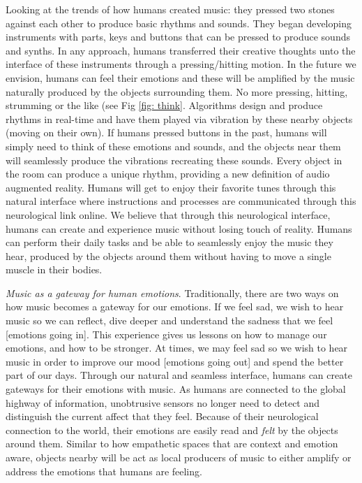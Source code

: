 \documentclass[sigchi]{acmart}
\begin{document}
Looking at the trends of how humans created music:  they pressed two stones against each other to produce basic rhythms and sounds. They began developing instruments with parts, keys and buttons that can be pressed to produce sounds and synths. In any approach, humans transferred their creative thoughts unto the interface of these instruments through a pressing/hitting motion. In the future we envision, humans can feel their emotions and these will be amplified by the music naturally produced by the objects surrounding them. No more pressing, hitting, strumming or the like (see Fig \ref{fig: think}. Algorithms design and produce rhythms in real-time and have them played via vibration by these nearby objects (moving on their own). If humans pressed buttons in the past, humans will simply need to think of these emotions and sounds, and the objects near them will seamlessly produce the vibrations recreating these sounds. Every object in the room can produce a unique rhythm, providing a new definition of audio augmented reality. Humans will get to enjoy their favorite tunes through this natural interface where instructions and processes are communicated through this neurological link online. We believe that through this neurological interface, humans can create and experience music without losing touch of reality. Humans can perform their daily tasks and be able to seamlessly enjoy the music they hear, produced by the objects around them without having to move a single muscle in their bodies. 

\textit{Music as a gateway for human emotions}. Traditionally, there are two ways on how music becomes a gateway for our emotions. If we feel sad, we wish to hear music so we can reflect, dive deeper and understand the sadness that we feel [emotions going in]. This experience gives us lessons on how to manage our emotions, and how to be stronger. At times, we may feel sad so we wish to hear music in order to improve our mood [emotions going out] and spend the better part of our days. Through our natural and seamless interface, humans can create gateways for their emotions with music. As humans are connected to the global highway of information, unobtrusive sensors no longer need to detect and distinguish the current affect that they feel. Because of their neurological connection to the world, their emotions are easily read and \textit{felt} by the objects around them. Similar to how empathetic spaces that are context and emotion aware, objects nearby will be act as local producers of music to either amplify or address the emotions that humans are feeling. 
% 
\end{document}

